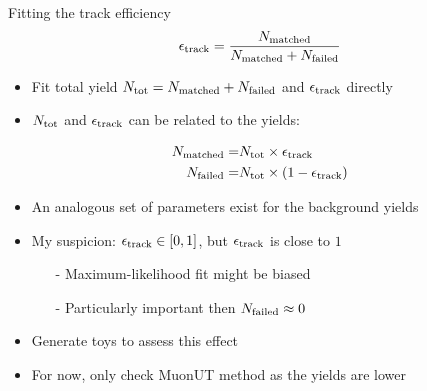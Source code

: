 \documentclass[xcolor={dvipsnames}]{beamer}
\begin{document}
\begin{frame}{Fitting the track efficiency}
  \vspace{0.0cm}
  \begin{equation*}
    \epsilon_{\rm track} = \frac{N_{\rm matched}}{N_{\rm matched} + N_{\rm failed}}
  \end{equation*}
  \begin{itemize}
    \setlength\itemsep{1.0em}
    \item{Fit total yield $N_{\rm tot} = N_{\rm matched} + N_{\rm failed}$ and $\epsilon_{\rm track}$ directly}
    \item{$N_{\rm tot}$ and $\epsilon_{\rm track}$ can be related to the yields:}
  \end{itemize}
  \vspace{-0.2cm}
  \begin{align*}
    N_{\rm matched} =& N_{\rm tot}\times\epsilon_{\rm track} \\
    N_{\rm failed} =& N_{\rm tot}\times(1 - \epsilon_{\rm track})
  \end{align*}
  \vspace{-0.5cm}
  \begin{itemize}
    \item{An analogous set of parameters exist for the background yields}
    \item{My suspicion: $\epsilon_{\rm track}\in[0, 1]$, but $\epsilon_{\rm track}$ is close to $1$}
    \begin{itemize}
      \item[-]{Maximum-likelihood fit might be biased}
      \item[-]{Particularly important then $N_{\rm failed}\approx 0$}
    \end{itemize}
    \item{Generate toys to assess this effect}
    \item{For now, only check MuonUT method as the yields are lower}
  \end{itemize}
\end{frame}
\end{document}
